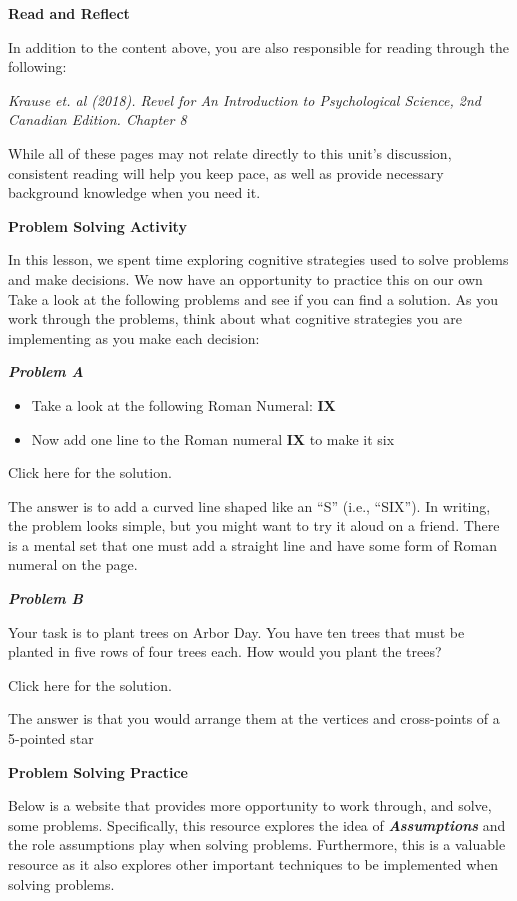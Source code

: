 \documentclass[
]{book}
\providecommand{\tightlist}{%
  \setlength{\itemsep}{0pt}\setlength{\parskip}{0pt}}
\begin{document}
\begin{reflect}
\textbf{Read and Reflect}

In addition to the content above, you are also responsible for reading through the following:

\emph{Krause et. al (2018). Revel for An Introduction to Psychological Science, 2nd Canadian Edition. Chapter 8}

While all of these pages may not relate directly to this unit's discussion, consistent reading will help you keep pace, as well as provide necessary background knowledge when you need it.

\textbf{Problem Solving Activity}

In this lesson, we spent time exploring cognitive strategies used to solve problems and make decisions. We now have an opportunity to practice this on our own Take a look at the following problems and see if you can find a solution. As you work through the problems, think about what cognitive strategies you are implementing as you make each decision:

\textbf{\emph{Problem A}}

\begin{itemize}
\tightlist
\item
  Take a look at the following Roman Numeral: \textbf{IX}
\item
  Now add one line to the Roman numeral \textbf{IX} to make it six
\end{itemize}

Click here for the solution.

The answer is to add a curved line shaped like an ``S'' (i.e., ``SIX''). In writing, the problem looks simple, but you might want to try it aloud on a friend. There is a mental set that one must add a straight line and have some form of Roman numeral on the page.

\textbf{\emph{Problem B}}

Your task is to plant trees on Arbor Day. You have ten trees that must be planted in five rows of four trees each. How would you plant the trees?

Click here for the solution.

The answer is that you would arrange them at the vertices and cross-points of a 5-pointed star

\textbf{Problem Solving Practice}

Below is a website that provides more opportunity to work through, and solve, some problems. Specifically, this resource explores the idea of \textbf{\emph{Assumptions}} and the role assumptions play when solving problems. Furthermore, this is a valuable resource as it also explores other important techniques to be implemented when solving problems.


\end{reflect}
\end{document}

